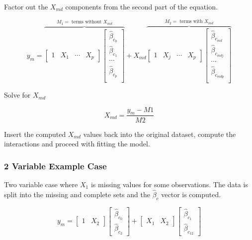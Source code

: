 \documentclass[../../paper.tex]{subfiles}
\begin{document}
Factor out the $X_{md}$ components from the second part of the equation.

\begin{equation}
  y_{m} =
  \overbrace{
  \begin{bmatrix}
    1 & X_{1} & \cdots & X_{p}
  \end{bmatrix}
  \begin{bmatrix}
    \hat{\beta}_{c_0} \\
    \hat{\beta}_{c_1} \\
    \cdots \\
    \hat{\beta}_{c_p} \\
  \end{bmatrix}}^{M_{1} = \text{ terms without } X_{md}} +
  X_{md}
  \overbrace{
  \begin{bmatrix}
    1 & X_{j} & \cdots & X_{p}
  \end{bmatrix}
  \begin{bmatrix}
    \hat{\beta}_{c_{md}} \\
    \hat{\beta}_{c_{mdj}} \\
    \cdots \\
    \hat{\beta}_{c_{mdp}} \\
  \end{bmatrix}}^{M_{2} = \text{ terms with } X_{md}}
\end{equation}

Solve for $X_{md}$

\begin{equation}
X_{md} = \frac{y_{m} - M1}{M2}
\end{equation}

Insert the computed $X_{md}$ values back into the original dataset, compute the interactions and proceed with fitting the model.

\subsubsection*{2 Variable Example Case}
Two variable case where $X_{1}$ is missing values for some observations. The data
is split into the missing and complete sets and the $\hat{\beta}_{c}$ vector is
computed.

\begin{equation}
  y_{m} =
  \begin{bmatrix}
    1 & X_{2}
  \end{bmatrix}
  \begin{bmatrix}
    \hat{\beta}_{c_0} \\
    \hat{\beta}_{c_2}
  \end{bmatrix} +
  \begin{bmatrix}
    X_{1} & X_{2}
  \end{bmatrix}
  \begin{bmatrix}
    \hat{\beta}_{c_1} \\
    \hat{\beta}_{c_{12}}
  \end{bmatrix}
\end{equation}
\end{document}
